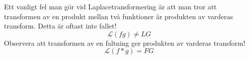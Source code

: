 \documentclass{article}
\begin{document}
Ett vanligt fel man gör vid Laplacetransformering är att man tror att transformen av en produkt mellan två funktioner är produkten av varderas transform. 
Detta är oftast inte fallet! 
$$\mathcal{L} (f g) \neq L G $$
Observera att transformen av en faltning ger produkten av varderas transform!
$$\mathcal{L} (f*g) = F G $$ %
\appendix
\end{document}
